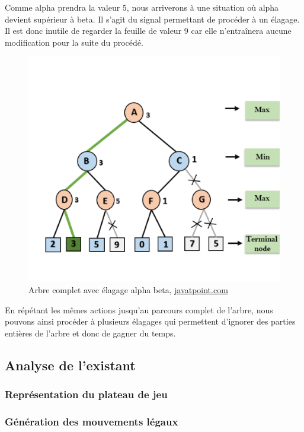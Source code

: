 \huge\documentclass{article}
\begin{document}
    Comme alpha prendra la valeur 5, nous arriverons à une situation où alpha devient supérieur à beta. Il s'agit du signal permettant de procéder à un élagage. Il est donc inutile de regarder la feuille de valeur 9 car elle n'entraînera aucune modification pour la suite du procédé.

    \newpage

    \begin{figure}[h]
        \centering
        \includegraphics[scale=0.8]{img/alpha-beta-pruning-step8.png}
        \caption{Arbre complet avec élagage alpha beta,
            \href{https://www.javatpoint.com/ai-alpha-beta-pruning}{javatpoint.com}}
    \end{figure}

    En répétant les mêmes actions jusqu'au parcours complet de l'arbre, nous pouvons ainsi procéder à plusieurs élagages qui permettent d'ignorer des parties entières de l'arbre et donc de gagner du temps.

    \subsection{Analyse de l'existant}
    \subsubsection{Représentation du plateau de jeu}
    \subsubsection{Génération des mouvements légaux}
\end{document}
